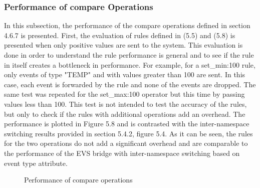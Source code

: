 \subsubsection{Performance of compare Operations}
In this subsection, the performance of the compare operations defined in section 4.6.7 is presented. First, the evaluation  of rules defined in (5.5) and (5.8) is presented when only positive values are sent to the system. This evaluation is done in order to understand the rule performance is general and to see if the rule in itself creates a bottleneck in performance. For example, for a set_min:100 rule, only events of type "TEMP" and with values greater than 100 are sent. In this case, each event is forwarded by the rule and none of the events are dropped. The same test was repeated for the set_max:100 operator but this time by passing values less than 100. This test is not intended to test the accuracy of the rules, but only to check if the rules with additional operations add an overhead. The performance is plotted in Figure 5.8 and is contrasted with the inter-namespace switching results provided in section 5.4.2, figure 5.4. As it can be seen, the rules for the two operations do not add a significant overhead and are comparable to the performance of the EVS bridge with inter-namespace switching based on event type attribute.
\begin{figure}[H]
 \centering
 \caption{Performance of compare operations}
 \hfill

\end{figure}


